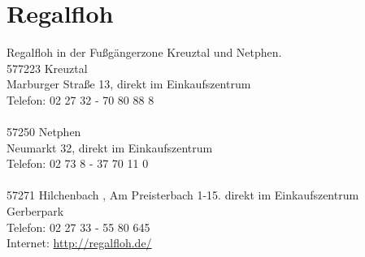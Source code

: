 \section{Regalfloh}
Regalfloh in der Fußgängerzone Kreuztal und Netphen.\\
577223 Kreuztal\\
Marburger Straße 13, direkt im Einkaufszentrum\\
Telefon: 02 27 32 - 70 80 88 8 \\
\\
57250 Netphen\\
Neumarkt 32, direkt im Einkaufszentrum\\
Telefon: 02 73 8 - 37 70 11 0 \\
\\
57271 Hilchenbach , Am Preisterbach 1-15. direkt im Einkaufszentrum Gerberpark\\
Telefon: 02 27 33 - 55 80  645\\
Internet: \href{http://regalfloh.de/}{http://regalfloh.de/}   